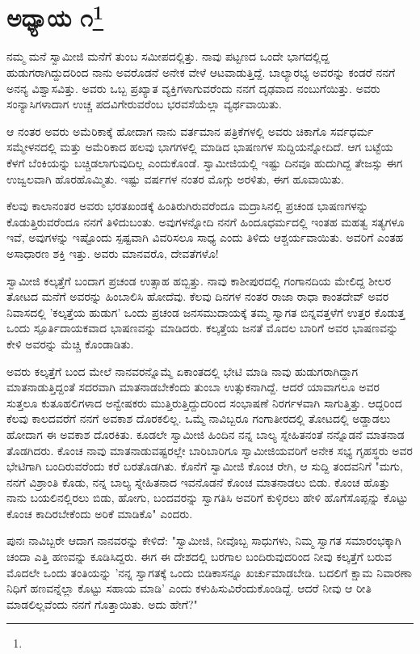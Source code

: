 
\chapter{ಅಧ್ಯಾಯ ೧\protect\footnote{}}

ನಮ್ಮ ಮನೆ ಸ್ವಾಮೀಜಿ ಮನೆಗೆ ತುಂಬ ಸಮೀಪದಲ್ಲಿತ್ತು. ನಾವು ಪಟ್ಟಣದ ಒಂದೇ ಭಾಗದಲ್ಲಿದ್ದ ಹುಡುಗರಾಗಿದ್ದುದರಿಂದ ನಾನು ಅವರೊಡನೆ ಅನೇಕ ವೇಳೆ ಆಟವಾಡುತ್ತಿದ್ದೆ. ಬಾಲ್ಯಾರಭ್ಯ ಅವರನ್ನು ಕಂಡರೆ ನನಗೆ ಅನನ್ಯ ವಿಶ್ವಾಸವಿತ್ತು. ಅವರು ಒಬ್ಬ ಪ್ರಖ್ಯಾತ ವ್ಯಕ್ತಿಗಳಾಗುವರೆಂದು ನನಗೆ ದೃಢವಾದ ನಂಬುಗೆಯಿತ್ತು. ಅವರು ಸಂನ್ಯಾಸಿಗಳಾದಾಗ ಉಚ್ಚ ಪದವಿಗೇರುವರೆಂಬ ಭರವಸೆಯೆಲ್ಲಾ ವ್ಯರ್ಥವಾಯಿತು.

ಆ ನಂತರ ಅವರು ಅಮೆರಿಕಾಕ್ಕೆ ಹೋದಾಗ ನಾನು ವರ್ತಮಾನ ಪತ್ರಿಕೆಗಳಲ್ಲಿ ಅವರು ಚಿಕಾಗೊ ಸರ್ವಧರ್ಮ ಸಮ್ಮೇಳನದಲ್ಲಿ ಮತ್ತು ಅಮೆರಿಕಾದ ಹಲವು ಭಾಗಗಳಲ್ಲಿ ಮಾಡಿದ ಭಾಷಣಗಳ ಸುದ್ದಿಯನ್ನೋದಿದೆ. ಆಗ ಬಟ್ಟೆಯ ಕೆಳಗೆ ಬೆಂಕಿಯನ್ನು ಬಚ್ಚಿಡಲಾಗುವುದಿಲ್ಲ ಎಂದುಕೊಂಡೆ. ಸ್ವಾಮೀಜಿಯಲ್ಲಿ ಇಷ್ಟು ದಿನವೂ ಹುದುಗಿದ್ದ ತೇಜಸ್ಸು ಈಗ ಉಜ್ವಲವಾಗಿ ಹೊರಹೊಮ್ಮಿತು. ಇಷ್ಟು ವರ್ಷಗಳ ನಂತರ ಮೊಗ್ಗು ಅರಳಿತು, ಈಗ ಹೂವಾಯಿತು.

ಕೆಲವು ಕಾಲಾನಂತರ ಅವರು ಭರತಖಂಡಕ್ಕೆ ಹಿಂತಿರುಗಿರುವರೆಂದೂ ಮದ್ರಾಸಿನಲ್ಲಿ ಪ್ರಚಂಡ ಭಾಷಣಗಳನ್ನು ಕೊಡುತ್ತಿರುವರೆಂದೂ ನನಗೆ ತಿಳಿದುಬಂತು. ಅವುಗಳನ್ನೋದಿ ನನಗೆ ಹಿಂದೂಧರ್ಮದಲ್ಲಿ ಇಂತಹ ಮಹತ್ವ ಸತ್ಯಗಳೂ ಇವೆ, ಅವುಗಳನ್ನು ಇಷ್ಟೊಂದು ಸ್ಪಷ್ಟವಾಗಿ ವಿವರಿಸಲೂ ಸಾಧ್ಯ ಎಂದು ತಿಳಿದು ಆಶ್ಚರ್ಯವಾಯಿತು. ಅವರಿಗೆ ಎಂತಹ ಅಸಾಧಾರಣ ಶಕ್ತಿ ಇತ್ತು. ಅವರು ಮಾನವರೊ, ದೇವತೆಗಳೊ!

ಸ್ವಾಮೀಜಿ ಕಲ್ಕತ್ತೆಗೆ ಬಂದಾಗ ಪ್ರಚಂಡ ಉತ್ಸಾಹ ಹಬ್ಬಿತ್ತು. ನಾವು ಕಾಶೀಪುರದಲ್ಲಿ ಗಂಗಾನದಿಯ ಮೇಲಿದ್ದ ಶೀಲರ ತೋಟದ ಮನೆಗೆ ಅವರನ್ನು ಹಿಂಬಾಲಿಸಿ ಹೋದೆವು. ಕೆಲವು ದಿನಗಳ ನಂತರ ರಾಜಾ ರಾಧಾ ಕಾಂತದೇವ್ ಅವರ ನಿವಾಸದಲ್ಲಿ 'ಕಲ್ಕತ್ತೆಯ ಹುಡುಗ' ಒಂದು ಪ್ರಚಂಡ ಜನಸಮುದಾಯಕ್ಕೆ ತಮ್ಮ ಸ್ವಾಗತ ಬಿನ್ನವತ್ತಳೆಗೆ ಉತ್ತರ ಕೊಡುತ್ತ ಒಂದು ಸ್ಪೂರ್ತಿದಾಯಕವಾದ ಭಾಷಣವನ್ನು ಮಾಡಿದರು. ಕಲ್ಕತ್ತೆಯ ಜನತೆ ಮೊದಲ ಬಾರಿಗೆ ಅವರ ಭಾಷಣವನ್ನು ಕೇಳಿ ಅವರನ್ನು ಮೆಚ್ಚಿ ಕೊಂಡಾಡಿತು.

ಅವರು ಕಲ್ಕತ್ತೆಗೆ ಬಂದ ಮೇಲೆ ನಾನವರನ್ನೊಮ್ಮೆ ಏಕಾಂತದಲ್ಲಿ ಭೇಟಿ ಮಾಡಿ ನಾವು ಹುಡುಗರಾಗಿದ್ದಾಗ ಮಾತನಾಡುತ್ತಿದ್ದಂತೆ ಸದರವಾಗಿ ಮಾತನಾಡಬೇಕೆಂದು ತುಂಬಾ ಉತ್ಸುಕನಾಗಿದ್ದೆ. ಆದರೆ ಯಾವಾಗಲೂ ಅವರ ಸುತ್ತಲೂ ಕುತೂಹಲಿಗಳಾದ ಅನ್ವೇಷಕರು ಮುತ್ತಿರುತ್ತಿದ್ದುದರಿಂದ ಸಂಭಾಷಣೆ ನಿರರ್ಗಳವಾಗಿ ಸಾಗುತ್ತಿತ್ತು. ಆದ್ದರಿಂದ ಕೆಲವು ಕಾಲದವರೆಗೆ ನನಗೆ ಅವಕಾಶ ದೊರಕಲಿಲ್ಲ. ಒಮ್ಮೆ ನಾವಿಬ್ಬರೂ ಗಂಗಾತೀರದಲ್ಲಿ ತೋಟದಲ್ಲಿ ಅಡ್ಡಾಡಲು ಹೋದಾಗ ಈ ಅವಕಾಶ ದೊರಕಿತು. ಕೂಡಲೇ ಸ್ವಾಮೀಜಿ ಹಿಂದಿನ ನನ್ನ ಬಾಲ್ಯ ಸ್ನೇಹಿತನಂತೆ ನನ್ನೊಡನೆ ಮಾತನಾಡ ತೊಡಗಿದರು. ಕೊಂಚ ನಾವು ಮಾತನಾಡುವಷ್ಟರಲ್ಲೇ ಬಾರಿಬಾರಿಗೂ ಸ್ವಾಮೀಜಿಯವರಿಗೆ ಅನೇಕ ಸಭ್ಯ ಗೃಹಸ್ಥರು ಅವರ ಭೇಟಿಗಾಗಿ ಬಂದಿರುವರೆಂದು ಕರೆ ಬರತೊಡಗಿತು. ಕೊನೆಗೆ ಸ್ವಾಮೀಜಿ ಕೊಂಚ ರೇಗಿ, ಆ ಸುದ್ದಿ ತಂದವನಿಗೆ "ಮಗು, ನನಗೆ ವಿಶ್ರಾಂತಿ ಕೊಡು, ನನ್ನ ಬಾಲ್ಯ ಸ್ನೇಹಿತನಾದ ಇವನೊಡನೆ ಕೊಂಚ ಮಾತನಾಡಲು ಬಿಡು. ಕೊಂಚ ಹೊತ್ತು ನಾನು ಬಯಲಿನಲ್ಲಿರಲು ಬಿಡು, ಹೋಗು, ಬಂದವರನ್ನು ಸ್ವಾಗತಿಸಿ ಅವರಿಗೆ ಕುಳ್ಳಿರಲು ಹೇಳಿ ಹೊಗೆಸೊಪ್ಪನ್ನು ಕೊಟ್ಟು ಕೊಂಚ ಕಾದಿರಬೇಕೆಂದು ಅರಿಕೆ ಮಾಡಿಕೊ" ಎಂದರು.

ಪುನಃ ನಾವಿಬ್ಬರೇ ಆದಾಗ ನಾನವರನ್ನು ಕೇಳಿದೆ: "ಸ್ವಾಮೀಜಿ, ನೀವೊಬ್ಬ ಸಾಧುಗಳು, ನಿಮ್ಮ ಸ್ವಾಗತ ಸಮಾರಂಭಕ್ಕಾಗಿ ಚಂದಾ ಎತ್ತಿ ಹಣವನ್ನು ಕೂಡಿಸಿದ್ದರು. ಈಗ ಈ ದೇಶದಲ್ಲಿ ಬರಗಾಲ ಬಂದಿರುವುದರಿಂದ ನೀವು ಕಲ್ಕತ್ತೆಗೆ ಬರುವ ಮೊದಲೇ ಒಂದು ತಂತಿಯನ್ನು 'ನನ್ನ ಸ್ವಾಗತಕ್ಕೆ ಒಂದು ಬಿಡಿಕಾಸನ್ನೂ ಖರ್ಚುಮಾಡಬೇಡಿ. ಬದಲಿಗೆ ಕ್ಷಾಮ ನಿವಾರಣಾ ನಿಧಿಗೆ ಹಣವನ್ನೆಲ್ಲಾ ಕೊಟ್ಟು ಸಹಾಯ ಮಾಡಿ' ಎಂದು ಕಳುಹಿಸುವಿರೆಂದುಕೊಂಡಿದ್ದೆ. ಆದರೆ ನೀವು ಆ ರೀತಿ ಮಾಡಲಿಲ್ಲವೆಂದು ನನಗೆ ಗೊತ್ತಾಯಿತು. ಅದು ಹೇಗೆ?"

